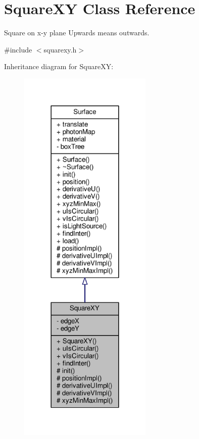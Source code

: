 \hypertarget{classSquareXY}{}\section{Square\+XY Class Reference}
\label{classSquareXY}


Square on x-\/y plane Upwards means outwards.  




{\ttfamily \#include $<$squarexy.\+h$>$}



Inheritance diagram for Square\+XY\+:\nopagebreak
\begin{figure}[H]
\begin{center}
\leavevmode
\includegraphics[width=180pt]{classSquareXY__inherit__graph}
\end{center}
\end{figure}


